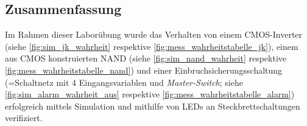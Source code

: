 \documentclass[12pt,english,ngerman]{scrartcl}
\begin{document}
\subsection{Zusammenfassung}
Im Rahmen dieser Laborübung wurde das Verhalten von einem CMOS-Inverter (siehe \autoref{fig:sim_jk_wahrheit}
respektive \autoref{fig:mess_wahrheitstabelle_jk}), 
einem aus CMOS konstruierten NAND (siehe \autoref{fig:sim_nand_wahrheit}
respektive \autoref{fig:mess_wahrheitstabelle_nand}) und einer Einbruchsicherungsschaltung 
(=Schaltnetz mit 4 Eingangsvariablen
und \textit{Master-Switch}; siehe \autoref{fig:sim_alarm_wahrheit_aus}
respektive \autoref{fig:mess_wahrheitstabelle_alarm}) erfolgreich mittels 
Simulation und mithilfe von LEDs an Steckbrettschaltungen
verifiziert.
\newpage

\printbibliography

\listoffigures

\listoftables
\end{document}
